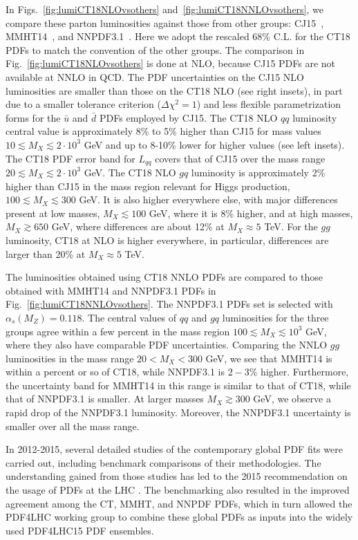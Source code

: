 In Figs.~\ref{fig:lumiCT18NLOvsothers}
and~\ref{fig:lumiCT18NNLOvsothers}, we compare these
parton luminosities against those from other groups:
CJ15~\cite{Accardi:2016qay}, MMHT14~\cite{Harland-Lang:2014zoa}, and
NNPDF3.1~\cite{Ball:2017nwa}. Here we adopt the rescaled 68\% C.L. for
the CT18 PDFs to match the convention of the other groups. 
The comparison in Fig.~\ref{fig:lumiCT18NLOvsothers} is done at NLO, 
because CJ15 PDFs are not available at NNLO in QCD. 
The PDF uncertainties on the CJ15 NLO luminosities
are smaller than those on the CT18 NLO (see right insets), in part 
due to a smaller tolerance criterion ($\Delta \chi^2 =1$) and less
flexible parametrization forms for the $\bar u$ and $\bar d$ PDFs
employed by CJ15.
The CT18 NLO $qq$ luminosity central value is approximately 8\% to 5\% higher than CJ15 for mass 
values $10\lesssim M_{X}\lesssim 2\cdot  10^{3}$ GeV and up to 8-10\% lower for higher values (see left insets). 
The CT18 PDF error band for $L_{qq}$ covers that of CJ15  over the mass range $20\lesssim M_{X}\lesssim 2\cdot  10^{3}$ GeV. 
The CT18 NLO $gq$ luminosity is approximately 2\% higher than CJ15 in
the mass region relevant for Higgs production,
$100\lesssim M_{X}\lesssim 300$ GeV. It is also higher everywhere
else, with major differences present at low masses, $M_X\lesssim 100$ GeV, where it is 8\% higher,
and at high masses, $M_X \gtrsim 650$ GeV, where differences are about 12\% at $M_X \approx 5$ TeV. 
For the $gg$ luminosity, CT18 at NLO is higher everywhere, in particular, differences are larger than 20\% at $M_X \approx 5$ TeV.

The luminosities obtained using CT18 NNLO PDFs are compared to those obtained with MMHT14 and NNPDF3.1 PDFs in Fig.~\ref{fig:lumiCT18NNLOvsothers}. 
The NNPDF3.1 PDFs set is selected with $\alpha_s(M_Z) = 0.118$. 
The  central values  of $qq$ and $gq$ luminosities for the three
groups agree within a few percent in the mass region $100\lesssim
M_{X}\lesssim 10^{3}$ GeV, where they also have comparable PDF
uncertainties.
Comparing the NNLO $gg$ luminosities in the mass range $20 < M_X < 300$ GeV,  we see that MMHT14 is within a percent or so of CT18, while NNPDF3.1 is $2-3\%$ higher. Furthermore, the uncertainty band for MMHT14 in this range is similar to that of CT18, while that of NNPDF3.1 is smaller.
At larger masses $M_X \gtrsim 300$ GeV, we observe a rapid drop of the
NNPDF3.1 luminosity. Moreover, the NNPDF3.1 uncertainty is smaller
over all the mass range.      

In 2012-2015, several detailed studies \cite{Ball:2012wy, Rojo:2015acz, Butterworth:2015oua} of the contemporary global PDF fits were carried out, including benchmark comparisons of their methodologies. The understanding gained from those studies has led to the 2015 recommendation on the usage of PDFs at the LHC \cite{Butterworth:2015oua}. The benchmarking also resulted in the improved agreement among the CT, MMHT, and NNPDF PDFs, which in turn allowed the PDF4LHC working group to combine these global PDFs as inputs  into the widely used PDF4LHC15 PDF ensembles. 


